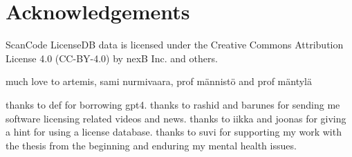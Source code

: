 \section*{Acknowledgements}
ScanCode LicenseDB data is licensed under the Creative Commons Attribution License 4.0 (CC-BY-4.0) by nexB Inc. and others.

much love to artemis, sami nurmivaara, prof männistö and prof mäntylä

thanks to def for borrowing gpt4. thanks to rashid and barunes for sending me software licensing related videos and news. thanks to iikka and joonas for giving a hint for using a license database. thanks to suvi for supporting my work with the thesis from the beginning and enduring my mental health issues.
